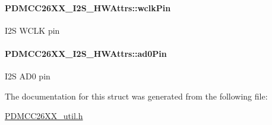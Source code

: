 \paragraph[{wclk\+Pin}]{ P\+D\+M\+C\+C26\+X\+X\+\_\+\+I2\+S\+\_\+\+H\+W\+Attrs\+::wclk\+Pin}\label{struct_p_d_m_c_c26_x_x___i2_s___h_w_attrs_a521d8c38b647738c7fbb4ef89058da0d}
I2\+S W\+C\+L\+K pin 
\paragraph[{ad0\+Pin}]{ P\+D\+M\+C\+C26\+X\+X\+\_\+\+I2\+S\+\_\+\+H\+W\+Attrs\+::ad0\+Pin}\label{struct_p_d_m_c_c26_x_x___i2_s___h_w_attrs_a42b84a967e7257dda186a3a10b28089a}
I2\+S A\+D0 pin 

The documentation for this struct was generated from the following file\+:\begin{DoxyCompactItemize}
\item 
\hyperlink{_p_d_m_c_c26_x_x__util_8h}{P\+D\+M\+C\+C26\+X\+X\+\_\+util.\+h}\end{DoxyCompactItemize}

